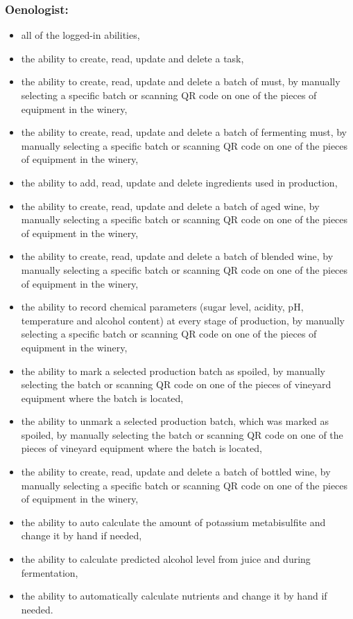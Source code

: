 \subsubsection{Oenologist:}
\begin{itemize}
	\item all of the logged-in abilities,
	\item the ability to create, read, update and delete a task,
	\item the ability to create, read, update and delete a batch of must, by manually selecting a specific batch or scanning QR code on one of the pieces of equipment in the winery,
	\item the ability to create, read, update and delete a batch of fermenting must, by manually selecting a specific batch or scanning QR code on one of the pieces of equipment in the winery,
	\item the ability to add, read, update and delete ingredients used in production,
	\item the ability to create, read, update and delete a batch of aged wine, by manually selecting a specific batch or scanning QR code on one of the pieces of equipment in the winery,
	\item the ability to create, read, update and delete a batch of blended wine, by manually selecting a specific batch or scanning QR code on one of the pieces of equipment in the winery,
	\item the ability to record chemical parameters (sugar level, acidity, pH, temperature and alcohol content) at every stage of production, by manually selecting a specific batch or scanning QR code on one of the pieces of equipment in the winery,
	\item the ability to mark a selected production batch as spoiled, by manually selecting the batch or scanning QR code on one of the pieces of vineyard equipment where the batch is located,
	\item the ability to unmark a selected production batch, which was marked as spoiled, by manually selecting the batch or scanning QR code on one of the pieces of vineyard equipment where the batch is located,
	\item the ability to create, read, update and delete a batch of bottled wine, by manually selecting a specific batch or scanning QR code on one of the pieces of equipment in the winery,
	\item the ability to auto calculate the amount of potassium metabisulfite and change it by hand if needed,
	\item the ability to calculate predicted alcohol level from juice and during fermentation,
	\item the ability to automatically calculate nutrients and change it by hand if needed.
\end{itemize}
